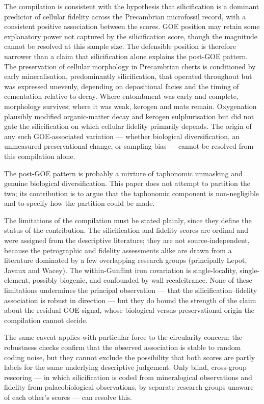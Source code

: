 \documentclass[11pt]{article}
\begin{document}
The compilation is consistent with the hypothesis that silicification is a dominant predictor of
cellular fidelity across the Precambrian microfossil record, with a consistent positive association
between the scores. GOE position may retain some explanatory power not captured by the silicification
score, though the magnitude cannot be resolved at this sample size. The defensible position is
therefore narrower than a claim that silicification alone explains the post-GOE pattern. The
preservation of cellular morphology in Precambrian cherts is conditioned by early mineralisation,
predominantly silicification, that operated throughout but was expressed unevenly, depending on
depositional facies and the timing of cementation relative to decay. Where entombment was early and
complete, morphology survives; where it was weak, kerogen and mats remain. Oxygenation plausibly
modified organic-matter decay and kerogen sulphurisation \citep{Lepot2009,Decraene2021} but did not
gate the silicification on which cellular fidelity primarily depends. The origin of any such
GOE-associated variation --- whether biological diversification, an unmeasured preservational change,
or sampling bias --- cannot be resolved from this compilation alone.

The post-GOE pattern is probably a mixture of taphonomic unmasking and genuine biological
diversification. This paper does not attempt to partition the two; its contribution is to argue that
the taphonomic component is non-negligible and to specify how the partition could be made.

The limitations of the compilation must be stated plainly, since they define the status of the
contribution. The silicification and fidelity scores are ordinal and were assigned from the
descriptive literature; they are not source-independent, because the petrographic and fidelity
assessments alike are drawn from a literature dominated by a few overlapping research groups
(principally Lepot, Javaux and Wacey). The within-Gunflint iron covariation is single-locality,
single-element, possibly biogenic, and confounded by wall recalcitrance. None of these limitations
undermines the principal observation --- that the silicification--fidelity association is robust in
direction --- but they do bound the strength of the claim about the residual GOE signal, whose
biological versus preservational origin the compilation cannot decide.

The same caveat applies with particular force to the circularity concern: the robustness checks
confirm that the observed association is stable to random coding noise, but they cannot exclude the
possibility that both scores are partly labels for the same underlying descriptive judgement. Only blind, cross-group rescoring --- in which silicification is coded from
mineralogical observations and fidelity from palaeobiological observations, by separate research
groups unaware of each other's scores --- can resolve this.
\end{document}
